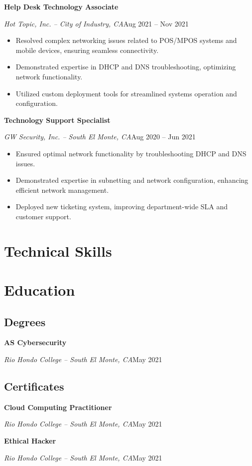 \documentclass[a4paper]{article}
\begin{document}
\vspace{0.5em}
\textbf{Help Desk Technology Associate}\par
\textit{Hot Topic, Inc. -- City of Industry, CA}\hfill Aug 2021 -- Nov 2021

\begin{itemize}[noitemsep,nolistsep]
    \item Resolved complex networking issues related to POS/MPOS systems and mobile devices, ensuring seamless connectivity.
    \item Demonstrated expertise in DHCP and DNS troubleshooting, optimizing network functionality.
    \item Utilized custom deployment tools for streamlined systems operation and configuration.
\end{itemize}

\vspace{0.5em}
\textbf{Technology Support Specialist}\par
\textit{GW Security, Inc. -- South El Monte, CA}\hfill Aug 2020 -- Jun 2021

\begin{itemize}[noitemsep,nolistsep]
    \item Ensured optimal network functionality by troubleshooting DHCP and DNS issues.
    \item Demonstrated expertise in subnetting and network configuration, enhancing efficient network management.
    \item Deployed new ticketing system, improving department-wide SLA and customer support.
\end{itemize}

\section{Technical Skills}
\begin{minipage}{\textwidth}
\begin{itemize}
    \apptechnicalskills{}
\end{itemize}
\end{minipage}

\newpage{}
\vspace*{-1em}
\section{Education}
\subsection{Degrees}
\textbf{AS Cybersecurity}\par
\textit{Rio Hondo College -- South El Monte, CA}\hfill May 2021

\subsection{Certificates}
\textbf{Cloud Computing Practitioner}\par
\textit{Rio Hondo College -- South El Monte, CA}\hfill May 2021

\textbf{Ethical Hacker}\par
\textit{Rio Hondo College -- South El Monte, CA}\hfill May 2021
\end{document}
